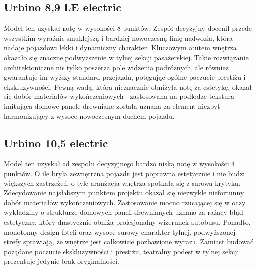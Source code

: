 \subsection{Urbino 8,9 LE electric}
Model ten uzyskał notę w wysokości 8 punktów. Zespół decyzyjny docenił przede wszystkim wyraźnie smuklejszą i bardziej nowoczesną linię nadwozia, która nadaje pojazdowi lekki i dynamiczny charakter. Kluczowym atutem wnętrza okazało się znaczne podwyższenie w tylnej sekcji pasażerskiej. Takie rozwiązanie architektoniczne nie tylko poszerza pole widzenia podróżnych, ale również gwarantuje im wyższy standard przejazdu, potęgując ogólne poczucie prestiżu i ekskluzywności. Pewną wadą, która nieznacznie obniżyła notę za estetykę, okazał się dobór materiałów wykończeniowych - zastosowana na podłodze tekstura imitująca domowe panele drewniane została uznana za element niezbyt harmonizujący z wysoce nowoczesnym duchem pojazdu.

\subsection{Urbino 10,5 electric}
Model ten uzyskał od zespołu decyzyjnego bardzo niską notę w wysokości 4 punktów. O ile bryła zewnętrzna pojazdu jest poprawna estetycznie i nie budzi większych zastrzeżeń, o tyle aranżacja wnętrza spotkała się z surową krytyką. Zdecydowanie najsłabszym punktem projektu okazał się niezwykle niefortunny dobór materiałów wykończeniowych. Zastosowanie mocno rzucającej się w oczy wykładziny o strukturze domowych paneli drewnianych uznano za rażący błąd estetyczny, który drastycznie obniża profesjonalny wizerunek autobusu. Ponadto, monotonny design foteli oraz wysoce surowy charakter tylnej, podwyższonej strefy sprawiają, że wnętrze jest całkowicie pozbawione wyrazu. Zamiast budować pożądane poczucie ekskluzywności i prestiżu, teatralny podest w tylnej sekcji prezentuje jedynie brak oryginalności.

